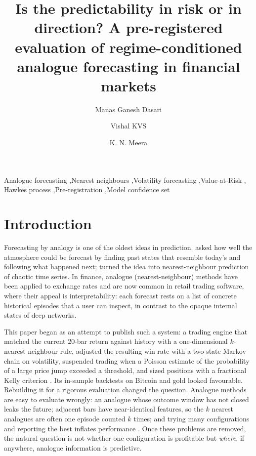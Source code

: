 \documentclass[preprint,12pt,authoryear]{elsarticle}
\begin{document}
\begin{frontmatter}

\title{Is the predictability in risk or in direction? A pre-registered evaluation of
regime-conditioned analogue forecasting in financial markets}

\author[cse]{Manas Ganesh Dasari}
\author[cse]{Vishal KVS}
\author[math]{K. N. Meera}



\begin{keyword}
Analogue forecasting \sep Nearest neighbours \sep Volatility forecasting \sep Value-at-Risk \sep
Hawkes process \sep Pre-registration \sep Model confidence set
\end{keyword}
\end{frontmatter}

\section{Introduction}

Forecasting by analogy is one of the oldest ideas in prediction. \citet{lorenz1969} asked how
well the atmosphere could be forecast by finding past states that resemble today's and
following what happened next; \citet{farmer1987} turned the idea into nearest-neighbour
prediction of chaotic time series. In finance, analogue (nearest-neighbour) methods have been
applied to exchange rates \citep{fernandez1999} and are now common in retail trading software,
where their appeal is interpretability: each forecast rests on a list of concrete historical
episodes that a user can inspect, in contrast to the opaque internal states of deep networks.

This paper began as an attempt to publish such a system: a trading engine that matched the
current 20-bar return against history with a one-dimensional $k$-nearest-neighbour rule,
adjusted the resulting win rate with a two-state Markov chain on volatility, suspended trading
when a Poisson estimate of the probability of a large price jump exceeded a threshold, and sized
positions with a fractional Kelly criterion \citep{kelly1956}. Its in-sample backtests on Bitcoin
and gold looked favourable. Rebuilding it for a rigorous evaluation changed the question.
Analogue methods are easy to evaluate wrongly: an analogue whose outcome window has not closed
leaks the future; adjacent bars have near-identical features, so the $k$ nearest analogues are
often one episode counted $k$ times; and trying many configurations and reporting the best
inflates performance \citep{bailey2014,harvey2016}. Once these problems are removed, the natural
question is not whether one configuration is profitable but \emph{where}, if anywhere, analogue
information is predictive.
\end{document}
